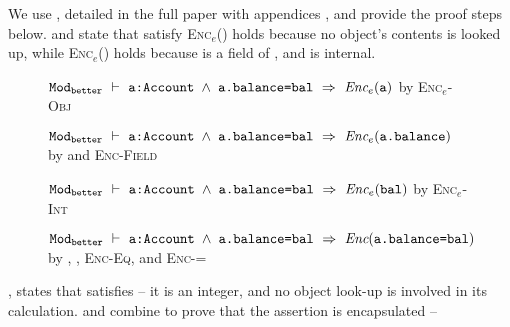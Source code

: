 We use , detailed in the full paper with appendices \cite{necessityFull}, 
and provide the proof steps below.
\textbf{} and \textbf{} state that 
 satisfy 
\textsc{Enc}$_e$() holds because no object's contents is looked up,
while \textsc{Enc}$_e$() holds because  is a field of , and  is
internal.
\\
\begin{figure}[h]
\begin{proofexample}
	{\begin{proofexample}
			{\proofstepwithrule
			{${\texttt{Mod}}_{{\texttt{better}}}\ \vdash\ {\texttt{a:Account $\wedge$ a.balance=bal}}\ \Rightarrow\ \textit{Enc$_e$}({\texttt{a}})$}
				{by \textsc{Enc$_e$-Obj}}
		}
		\endproofsteps
	\end{proofexample}
		}
	{\begin{proofexample}
		\proofsteps{\prg{balanceEnc}}
			{\proofstepwithrule
			{${\texttt{Mod}}_{{\texttt{better}}}\ \vdash\ {\texttt{a:Account $\wedge$ a.balance=bal}}\ \Rightarrow\ \textit{Enc$_e$}({\texttt{a.balance}})$}
				{by  and \textsc{Enc-Field}}
		}
		\endproofsteps
	\end{proofexample}
		}
	{\begin{proofexample}
		\proofsteps{\prg{balEnc}}
			{\proofstepwithrule
			{${\texttt{Mod}}_{{\texttt{better}}}\ \vdash\ {\texttt{a:Account $\wedge$ a.balance=bal}}\ \Rightarrow\ \textit{Enc$_e$}({\texttt{bal}})$}
				{by \textsc{Enc$_e$-Int}}
		}
		\endproofsteps
	\end{proofexample}
		}
		{\proofstepwithrule
			{
			${\texttt{Mod}}_{{\texttt{better}}}\ \vdash\ {\texttt{a:Account $\wedge$ a.balance=bal}}\ \Rightarrow\ \textit{Enc}({\texttt{a.balance=bal}})$
			}{by , , \textsc{Enc-Eq}, and \textsc{Enc-=}}}
\endproofsteps
\end{proofexample}
\end{figure}


,  \textbf{} states that  satisfies 
-- it is an integer, and no object look-up is involved in its calculation.
\textbf{} and \textbf{} combine to prove that the assertion  is encapsulated --


